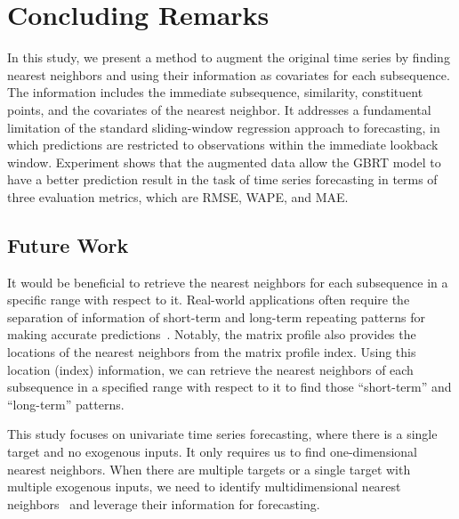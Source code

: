 \section{Concluding Remarks} \label{sec:conclusion}

In this study, we present a method to augment the original time series by finding nearest neighbors and using their information as covariates for each subsequence.
The information includes the immediate subsequence, similarity, constituent points, and the covariates of the nearest neighbor.
It addresses a fundamental limitation of the standard sliding-window regression approach to forecasting, in which predictions are restricted to observations within the immediate lookback window.
Experiment shows that the augmented data allow the GBRT model to have a better prediction result in the task of time series forecasting in terms of three evaluation metrics, which are RMSE, WAPE, and MAE.

\subsection{Future Work}

\noindent{}It would be beneficial to retrieve the nearest neighbors for each subsequence in a specific range with respect to it.
Real-world applications often require the separation of information of short-term and long-term repeating patterns for making accurate predictions~\cite {lai2018modeling}.
Notably, the matrix profile also provides the locations of the nearest neighbors from the matrix profile index. Using this location (index) information, we can retrieve the nearest neighbors of each subsequence in a specified range with respect to it to find those ``short-term'' and ``long-term'' patterns.

\noindent{}This study focuses on univariate time series forecasting, where there is a single target and no exogenous inputs. It only requires us to find one-dimensional nearest neighbors.
When there are multiple targets or a single target with multiple exogenous inputs, we need to identify multidimensional nearest neighbors~\cite{yeh2017matrixa} and leverage their information for forecasting.

